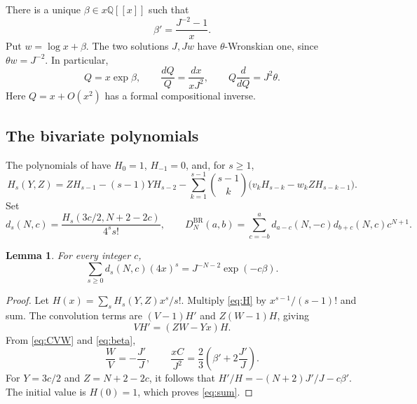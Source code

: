 \documentclass[11pt]{article}
\newtheorem{lemma}[theorem]{Lemma}
\theoremstyle{definition}
\newcommand{\Q}{\mathbb Q}
\newcommand{\BR}{\mathrm{BR}}
\numberwithin{equation}{section}
\begin{document}
There is a unique $\beta\in x\Q[[x]]$ such that
\begin{equation}\label{eq:beta}
 \beta'=\frac{J^{-2}-1}{x}.
\end{equation}
Put $w=\log x+\beta$. The two solutions $J,Jw$ have
$\theta$-Wronskian one, since $\theta w=J^{-2}$.
In particular,
\begin{equation}\label{eq:coordinate}
 Q=x\exp\beta,\qquad
 \frac{dQ}{Q}=\frac{dx}{xJ^2},\qquad
 Q\frac d{dQ}=J^2\theta.
\end{equation}
Here $Q=x+O(x^2)$ has a formal compositional inverse.

\subsection{The bivariate polynomials}
The polynomials of \cite[formula (5.10)]{BR} have $H_0=1$, $H_{-1}=0$,
and, for $s\ge1$,
\begin{equation}\label{eq:H}
 H_s(Y,Z)=ZH_{s-1}-(s-1)YH_{s-2}
 -\sum_{k=1}^{s-1}\binom{s-1}{k}
       \bigl(v_kH_{s-k}-w_kZH_{s-k-1}\bigr).
\end{equation}
Set
\begin{equation}\label{eq:dD}
 d_s(N,c)=\frac{H_s(3c/2,N+2-2c)}{4^ss!},\qquad
 D_N^{\BR}(a,b)=\sum_{c=-b}^{a}
     d_{a-c}(N,-c)d_{b+c}(N,c)c^{N+1}.
\end{equation}

\begin{lemma}\label{lem:sum}
For every integer $c$,
\begin{equation}\label{eq:sum}
 \sum_{s\ge0}d_s(N,c)(4x)^s
     =J^{-N-2}\exp(-c\beta).
\end{equation}
\end{lemma}
\begin{proof}
Let $H(x)=\sum_sH_s(Y,Z)x^s/s!$.
Multiply \eqref{eq:H} by $x^{s-1}/(s-1)!$ and sum.
The convolution terms are $(V-1)H'$ and $Z(W-1)H$, giving
\[
 VH'=(ZW-Yx)H.
\]
From \eqref{eq:CVW} and \eqref{eq:beta},
\[
 \frac WV=-\frac{J'}J,\qquad
 \frac{xC}{J^2}=\frac23\left(\beta'+2\frac{J'}J\right).
\]
For $Y=3c/2$ and $Z=N+2-2c$, it follows that
$H'/H=-(N+2)J'/J-c\beta'$. The initial value is $H(0)=1$,
which proves \eqref{eq:sum}.
\end{proof}
\end{document}
